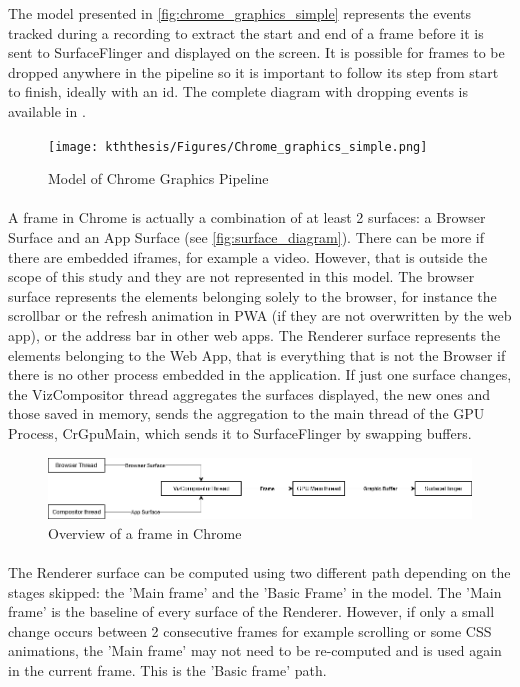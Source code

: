 \documentclass{kththesis}
\begin{document}
The model presented in \autoref{fig:chrome_graphics_simple} represents the events tracked during a recording to extract the start and end of a frame before it is sent to SurfaceFlinger and displayed on the screen. It is possible for frames to be dropped anywhere in the pipeline so it is important to follow its step from start to finish, ideally with an id. The complete diagram with dropping events is available in .

\begin{figure}[!ht]
    \centering
    \texttt{[image: kththesis/Figures/Chrome\_graphics\_simple.png]}
    \caption{Model of Chrome Graphics Pipeline}
    \label{fig:chrome_graphics_simple}
\end{figure}
        
        
   
        
 \paragraph{}
A frame in Chrome is actually a combination of at least 2 surfaces: a Browser Surface and an App Surface (see \autoref{fig:surface_diagram}). There can be more if there are embedded iframes, for example a video. However, that is outside the scope of this study and they are not represented in this model. The browser surface represents the elements belonging solely to the browser, for instance the scrollbar or the refresh animation in PWA (if they are not overwritten by the web app), or the address bar in other web apps. The Renderer surface represents the elements belonging to the Web App, that is everything that is not the Browser if there is no other process embedded in the application. If just one surface changes, the VizCompositor thread aggregates the surfaces displayed, the new ones and those saved in memory, sends the aggregation to the main thread of the GPU Process, CrGpuMain, which sends it to SurfaceFlinger by swapping buffers. 

\begin{figure}
    \centering
    \includegraphics[width=13cm]{kththesis/Figures/surface_diagram.png}
    \caption{Overview of a frame in Chrome}
    \label{fig:surface_diagram}
\end{figure}
\paragraph{}
The Renderer surface can be computed using two different path depending on the stages skipped: the 'Main frame' and the 'Basic Frame' in the model. The 'Main frame' is the baseline of every surface of the Renderer. However, if only a small change occurs between 2 consecutive frames for example scrolling or some CSS animations, the 'Main frame' may not need to be re-computed and is used again in the current frame. This is the 'Basic frame' path. \newline
\end{document}
